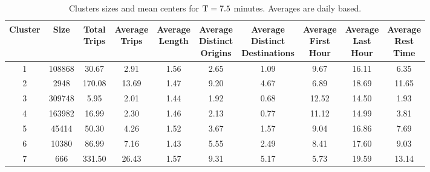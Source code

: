 \begin{table*}[t]
\centering
\small
\begin{tabular}{c c c c c c c c c c}
  \hline
 Cluster &  Size & \thead{Total\\Trips} & \thead{Average\\Trips} & \thead{Average\\Length} & \thead{Average\\Distinct\\Origins} & \thead{Average\\Distinct\\Destinations} & \thead{Average\\First\\Hour} & \thead{Average\\Last\\Hour} & \thead{Average\\Rest\\Time} \\
  \hline
  1 & 108868 & 30.67 & 2.91 & 1.56 & 2.65 & 1.09 & 9.67 & 16.11 & 6.35 \\
  2 & 2948 & 170.08 & 13.69 & 1.47 & 9.20 & 4.67 & 6.89 & 18.69 & 11.65 \\
  3 & 309748 & 5.95 & 2.01 & 1.44 & 1.92 & 0.68 & 12.52 & 14.50 & 1.93 \\
  4 & 163982 & 16.99 & 2.30 & 1.46 & 2.13 & 0.77 & 11.12 & 14.99 & 3.81 \\
  5 & 45414 & 50.30 & 4.26 & 1.52 & 3.67 & 1.57 & 9.04 & 16.86 & 7.69 \\
  6 & 10380 & 86.99 & 7.16 & 1.43 & 5.55 & 2.49 & 8.41 & 17.60 & 9.03 \\
  7 & 666 & 331.50 & 26.43 & 1.57 & 9.31 & 5.17 & 5.73 & 19.59 & 13.14 \\
   \hline
\end{tabular}
\caption{Clusters sizes and mean centers for $\mathrm{T} = 7.5$ minutes. Averages are daily based.}
\label{t:kmeans_centers_450}
\end{table*}

